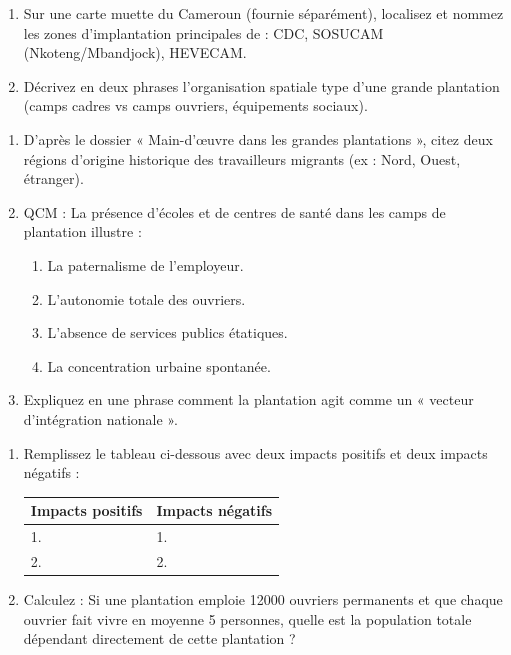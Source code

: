 \documentclass[11pt]{article}
\begin{document}
\begin{exercice}
\begin{enumerate}
    \item Sur une carte muette du Cameroun (fournie séparément), localisez et nommez les zones d'implantation principales de : CDC, SOSUCAM (Nkoteng/Mbandjock), HEVECAM.
    \item Décrivez en deux phrases l'organisation spatiale type d'une grande plantation (camps cadres vs camps ouvriers, équipements sociaux).
\end{enumerate}
\end{exercice}

\begin{exercice}
\begin{enumerate}
    \item D'après le dossier « Main-d'œuvre dans les grandes plantations », citez deux régions d'origine historique des travailleurs migrants (ex : Nord, Ouest, étranger).
    \item QCM : La présence d'écoles et de centres de santé dans les camps de plantation illustre :
    \begin{enumerate}
        \item La paternalisme de l'employeur.
        \item L'autonomie totale des ouvriers.
        \item L'absence de services publics étatiques.
        \item La concentration urbaine spontanée.
    \end{enumerate}
    \item Expliquez en une phrase comment la plantation agit comme un « vecteur d'intégration nationale ».
\end{enumerate}
\end{exercice}

\begin{exercice}
\begin{enumerate}
    \item Remplissez le tableau ci-dessous avec deux impacts positifs et deux impacts négatifs :
    \begin{tabular}{|p{5cm}|p{5cm}|}
        \hline
        \textbf{Impacts positifs} & \textbf{Impacts négatifs} \\ \hline
        1. & 1. \\ \hline
        2. & 2. \\ \hline
    \end{tabular}
    \item Calculez : Si une plantation emploie \num{12000} ouvriers permanents et que chaque ouvrier fait vivre en moyenne \num{5} personnes, quelle est la population totale dépendant directement de cette plantation ?
\end{enumerate}
\end{exercice}
\end{document}
